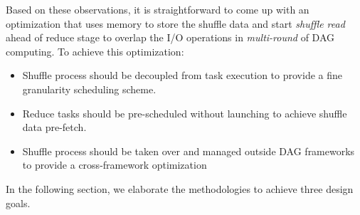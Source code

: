 Based on these observations, it is straightforward to come up with an optimization that uses memory to store the shuffle data and start \textit{shuffle read} ahead of reduce stage to overlap the I/O operations in \textit{multi-round} of DAG computing. To achieve this optimization:
\begin{itemize}
	\item Shuffle process should be decoupled from task execution to provide a fine granularity scheduling scheme.
	\item Reduce tasks should be pre-scheduled without launching to achieve shuffle data pre-fetch.
	\item Shuffle process should be taken over and managed outside DAG frameworks to provide a cross-framework optimization
\end{itemize}
In the following section, we elaborate the methodologies to achieve three design goals.
